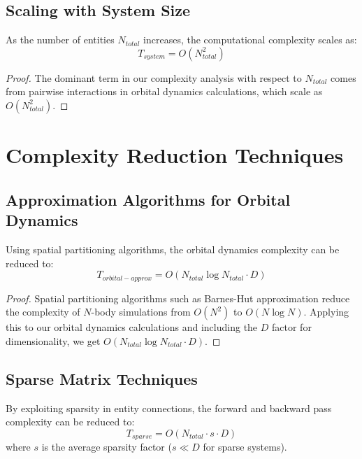 \subsection{Scaling with System Size}

\begin{theorem}
As the number of entities $N_{total}$ increases, the computational complexity scales as:
\begin{equation}
T_{system} = O(N_{total}^2)
\end{equation}
\end{theorem}

\begin{proof}
The dominant term in our complexity analysis with respect to $N_{total}$ comes from pairwise interactions in orbital dynamics calculations, which scale as $O(N_{total}^2)$.
\end{proof}

\section{Complexity Reduction Techniques}

\subsection{Approximation Algorithms for Orbital Dynamics}

\begin{theorem}
Using spatial partitioning algorithms, the orbital dynamics complexity can be reduced to:
\begin{equation}
T_{orbital-approx} = O(N_{total} \log N_{total} \cdot D)
\end{equation}
\end{theorem}

\begin{proof}
Spatial partitioning algorithms such as Barnes-Hut approximation reduce the complexity of $N$-body simulations from $O(N^2)$ to $O(N \log N)$. Applying this to our orbital dynamics calculations and including the $D$ factor for dimensionality, we get $O(N_{total} \log N_{total} \cdot D)$.
\end{proof}

\subsection{Sparse Matrix Techniques}

\begin{theorem}
By exploiting sparsity in entity connections, the forward and backward pass complexity can be reduced to:
\begin{equation}
T_{sparse} = O(N_{total} \cdot s \cdot D)
\end{equation}
where $s$ is the average sparsity factor ($s \ll D$ for sparse systems).
\end{theorem}

